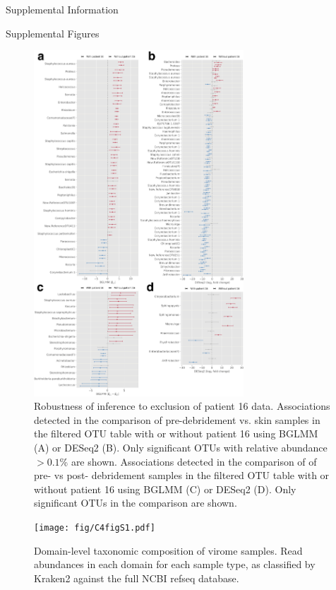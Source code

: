 \documentclass[oneside,12pt,final]{sty/ucthesis-CA2012}
\begin{document}
\begin{mainmatter}
\begin{section}{Supplemental Information}
\begin{subsection}{Supplemental Figures}
\begin{figure}[h]
\centering
\centerline{\includegraphics[width=0.7\textwidth]{fig/C3figS11.pdf}}
\caption{Robustness of inference to exclusion of patient 16 data. Associations detected in the comparison of pre-debridement vs. skin samples in the filtered OTU table with or without patient 16 using BGLMM (A) or DESeq2 (B). Only significant OTUs with relative abundance $>0.1$\% are shown. Associations detected in the comparison of of pre- vs post- debridement samples in the filtered OTU table with or without patient 16 using BGLMM (C) or DESeq2 (D). Only significant OTUs in the comparison are shown.}
\label{fig:figS11}
\end{figure}

\begin{figure}[h]
\centering
\centerline{\texttt{[image: fig/C4figS1.pdf]}}
\caption{Domain-level taxonomic composition of virome samples. Read abundances in each domain for each sample type, as classified by Kraken2 against the full NCBI refseq database.}
\label{fig:figC4S1}
\end{figure}


\end{subsection}
\end{section}
\end{mainmatter}
\end{document}

